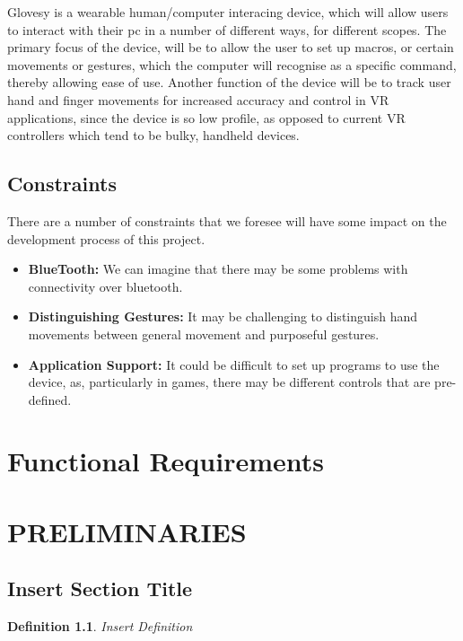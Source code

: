 \documentclass[12pt,a4paper,oneside]{book}
\theoremstyle{plain}
\newtheorem{de}[thm]{Definition}
\numberwithin{equation}{chapter}
\begin{document}
\noindent Glovesy is a wearable human/computer interacing device, which will allow users to interact with their pc in a number of different ways, for different scopes.  The primary focus of the device, will be to allow the user to set up macros, or certain movements or gestures, which the computer will recognise as a specific command, thereby allowing ease of use. Another function of the device will be to track user hand and finger movements for increased accuracy and control in VR applications, since the device is so low profile, as opposed to current VR controllers which tend to be bulky, handheld devices.

\section{Constraints}

\noindent There are a number of constraints that we foresee will have some impact on the development process of this project.

\begin{itemize}
    \item{\textbf{BlueTooth:} We can imagine that there may be some problems with connectivity over bluetooth.}
    \item{\textbf{Distinguishing Gestures:} It may be challenging to distinguish hand movements between general movement and purposeful gestures.}
    \item{\textbf{Application Support:} It could be difficult to set up programs to use the device, as, particularly in games, there may be different controls that are pre-defined.}
\end{itemize}

\chapter*{Functional Requirements}

\noindent 
\chapter*{PRELIMINARIES}

\section{Insert Section Title}\label{Sec2.1}

\begin{de}\label{def1}
	Insert Definition
\end{de}
\end{document}

